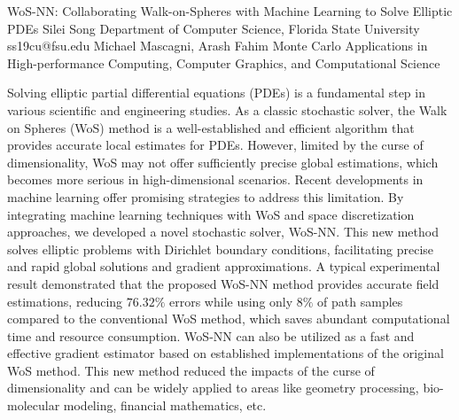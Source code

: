 \begin{talk}
  {WoS-NN: Collaborating Walk-on-Spheres with Machine Learning to Solve Elliptic PDEs}%
  {Silei Song}%
  {Department of Computer Science, Florida State University}%
  {ss19cu@fsu.edu}%
  {Michael Mascagni, Arash Fahim}%
  {Monte Carlo Applications in High-performance Computing, Computer Graphics, and Computational Science}%
    
   
Solving elliptic partial differential equations (PDEs) is a fundamental step in various scientific and engineering studies. As a classic stochastic solver, the Walk on Spheres (WoS) method is a well-established and efficient algorithm that provides accurate local estimates for PDEs. However, limited by the curse of dimensionality, WoS may not offer sufficiently precise global estimations, which becomes more serious in high-dimensional scenarios. Recent developments in machine learning offer promising strategies to address this limitation. By integrating machine learning techniques with WoS and space discretization approaches, we developed a novel stochastic solver, WoS-NN. This new method solves elliptic problems with Dirichlet boundary conditions, facilitating precise and rapid global solutions and gradient approximations. A typical experimental result demonstrated that the proposed WoS-NN method provides accurate field estimations, reducing $76.32\%$ errors while using only $8\%$ of path samples compared to the conventional WoS method, which saves abundant computational time and resource consumption. WoS-NN can also be utilized as a fast and effective gradient estimator based on established implementations of the original WoS method. This new method reduced the impacts of the curse of dimensionality and can be widely applied to areas like geometry processing, bio-molecular modeling, financial mathematics, etc.

\medskip

\end{talk}
